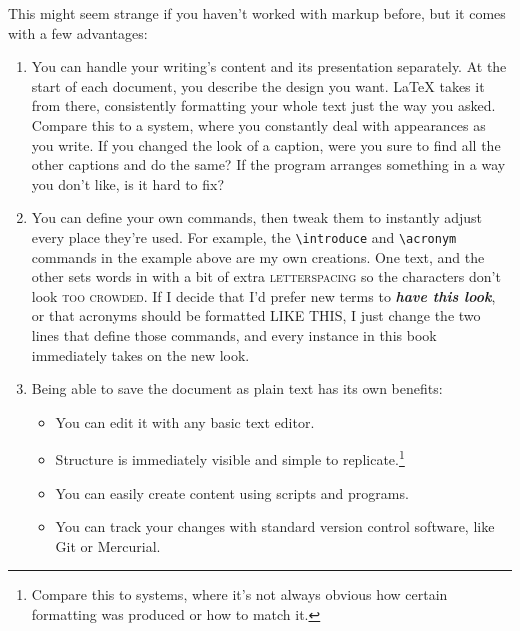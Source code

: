 This might seem strange if you haven't worked with markup before,
but it comes with a few advantages:
\begin{enumerate}
\item You can handle your writing's content and its presentation separately.
    At the start of each document,
    you describe the design you want.
    \LaTeX{} takes it from there, consistently formatting your whole text
    just the way you asked.
    Compare this to a  system,
    where you constantly deal with appearances
    as you write.
    If you changed the look of a caption,
    were you sure to find all the other captions and do the
    same?
    If the program arranges something in a way you don't like,
    is it hard to fix?%

\item You can define your own commands, then tweak them to instantly adjust
    every place they're used.
    For example, the \verb|\introduce| and \verb|\acronym| commands
    in the example above are my own creations.
    One  text, and the other sets words in
     with a bit of extra
    \mbox{\textsc{letterspacing}} so the characters
    don't look \textsc{too crowded}.
    If I decide that I'd prefer new terms to
    \textbf{\itshape have this look}, or that acronyms should be formatted
    {\small{} LIKE THIS},
    I just change the two lines that define those commands,
    and every instance in this book immediately takes on the new look.

\item Being able to save the document as plain text has its own benefits:
    \begin{itemize}
    \item You can edit it with any basic text editor.
    \item Structure is immediately visible
        and simple to replicate.\punckern\footnote{Compare this to
         systems, where it's not always obvious
        how certain formatting was produced or how to match it.}
    \item You can easily create content using scripts and programs.
    \item You can track your changes with standard version control software,
        like Git or Mercurial.
    \end{itemize}
\end{enumerate}

